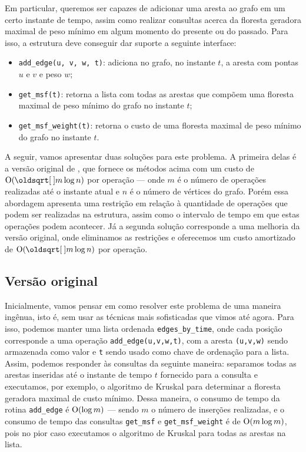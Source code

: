 Em particular, queremos ser capazes de adicionar uma aresta ao grafo em um certo instante de tempo, assim como realizar consultas acerca da floresta geradora maximal de peso mínimo em algum momento do presente ou do passado. Para isso, a estrutura deve conseguir dar suporte a seguinte interface:

\begin{itemize}
    \item \texttt{add\_edge(u, v, w, t)}: adiciona no grafo, no instante $t$, a aresta com pontas $u$ e $v$ e peso $w$;
    \item \texttt{get\_msf(t)}: retorna a lista com todas as arestas que compõem uma floresta maximal de peso mínimo do grafo no instante $t$;
    \item \texttt{get\_msf\_weight(t)}: retorna o custo de uma floresta maximal de peso mínimo do grafo no instante $t$.
\end{itemize}

A seguir, vamos apresentar duas soluções para este problema. A primeira delas é a versão original de \citet{10.1093/comjnl/bxaa135}, que fornece os métodos acima com um custo de $\Oh(\sqrt{m} \log n)$ por operação --- onde $m$ é o número de operações realizadas até o instante atual e $n$ é o número de vértices do grafo. Porém essa abordagem apresenta uma restrição em relação à quantidade de operações que podem ser realizadas na estrutura, assim como o intervalo de tempo em que estas operações podem acontecer. Já a segunda solução corresponde a uma melhoria da versão original, onde eliminamos as restrições e oferecemos um custo amortizado de $\Oh(\sqrt{m} \log n)$ por operação.

\subsection{Versão original}
\label{sec:rmsf-versao-ori}

Inicialmente, vamos pensar em como resolver este problema de uma maneira ingênua, isto é, sem usar as técnicas mais sofisticadas que vimos até agora. Para isso, podemos manter uma lista ordenada \texttt{edges\_by\_time}, onde cada posição corresponde a uma operação \texttt{add\_edge(u,v,w,t)}, com a aresta \texttt{(u,v,w)} sendo armazenada como valor e \texttt{t} sendo usado como chave de ordenação para a lista. Assim, podemos responder às consultas da seguinte maneira: separamos todas as arestas inseridas até o instante de tempo $t$ fornecido para a consulta e executamos, por exemplo, o algoritmo de Kruskal para determinar a floresta geradora maximal de custo mínimo. Dessa maneira, o consumo de tempo da rotina \texttt{add\_edge} é $\mathrm{O} (\log m)$ --- sendo $m$ o número de inserções realizadas, e o consumo de tempo das consultas \texttt{get\_msf} e \texttt{get\_msf\_weight} é de $\mathrm{O}(m \log m)$, pois no pior caso executamos o algoritmo de Kruskal para todas as arestas na lista.


